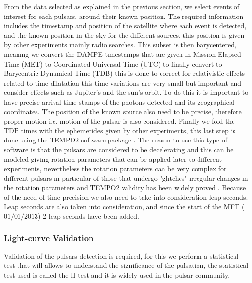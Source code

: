 \documentclass{PoS}
\begin{document}
From the data selected as explained in the previous section, we select events of interest for each pulsars, around their known position. The required information includes the timestamp and position of the satellite where each event is detected, and the known position in the sky for the different sources, this position is given by other experiments mainly radio searches.
This subset is then barycentered, meaning we convert the DAMPE timestamps that are given in Mission Elapsed Time (MET) to Coordinated Universal Time (UTC) to finally convert to Barycentric Dynamical Time (TDB) this is done to correct for relativistic effects related  to  time dilatation this time variations are very small but important and consider effects such as Jupiter's and the sun's orbit. To do this it is important  to have precise arrival time stamps of the photons detected and its geographical coordinates. The position of the known source also need to be precise, therefore proper motion i.e. motion of the pulsar is also considered. 
Finally we  fold the TDB times with the ephemerides given by other experiments, this last step is done using the TEMPO2 software package \cite{tempo2}.   The reason to use this  type of software is that the pulsars are considered to be decelerating and this can be modeled giving rotation parameters that can be applied later  to different experiments, nevertheless the  rotation parameters can be very complex for different  pulsars in particular of those that undergo "glitches" irregular changes in the rotation parameters and TEMPO2 validity has been widely proved \cite{2catalogfermi} \cite{geminga_fermi}. Because of the need of time precision we also need to take into consideration leap seconds. Leap seconds are also taken into consideration, and since the start of the MET ($01/01/2013$) 2 leap seconds have been added. 



\subsubsection{Light-curve Validation}
Validation of the pulsars detection is required, for this we perform a statistical test that will  allows to understand the significance of  the pulsation, the statistical test used is called the H-test and it is widely used in the pulsar community.
 
\end{document}

